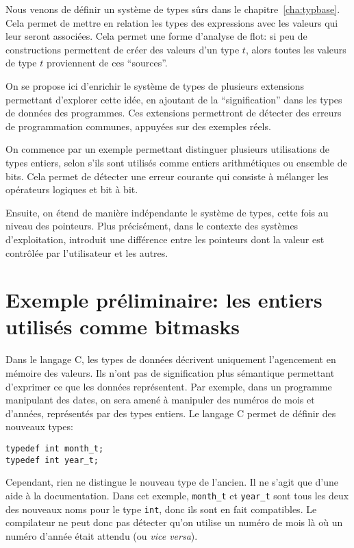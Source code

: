 

Nous venons de définir un système de types sûrs dans le
chapitre~\ref{cha:typbase}. Cela permet de mettre en relation les types des
expressions avec les valeurs qui leur seront associées. Cela permet une forme
d'analyse de flot: si peu de constructions permettent de créer des valeurs d'un
type $t$, alors toutes les valeurs de type $t$ proviennent de ces
\enquote{sources}.

On se propose ici d'enrichir le système de types de plusieurs extensions
permettant d'explorer cette idée, en ajoutant de la \enquote{signification} dans
les types de données des programmes. Ces extensions permettront de détecter des
erreurs de programmation communes, appuyées sur des exemples réels.

On commence par un exemple permettant distinguer plusieurs utilisations de types
entiers, selon s'ils sont utilisés comme entiers arithmétiques ou ensemble de
bits. Cela permet de détecter une erreur courante qui consiste à mélanger les
opérateurs logiques et bit à bit.

Ensuite, on étend de manière indépendante le système de types, cette fois au
niveau des pointeurs. Plus précisément, dans le contexte des systèmes
d'exploitation, introduit une différence entre les pointeurs dont la valeur est
contrôlée par l'utilisateur et les autres.

\section{Exemple préliminaire: les entiers utilisés comme bitmasks}

Dans le langage C, les types de données décrivent uniquement l'agencement en
mémoire des valeurs. Ils n'ont pas de signification plus sémantique permettant
d'exprimer ce que les données représentent. Par exemple, dans un programme
manipulant des dates, on sera amené à manipuler des numéros de mois et d'années,
représentés par des types entiers. Le langage C permet de définir des nouveaux
types:

\begin{verbatim}
typedef int month_t;
typedef int year_t;
\end{verbatim}

Cependant, rien ne distingue le nouveau type de l'ancien. Il ne s'agit que d'une
aide à la documentation. Dans cet exemple, \texttt{month\_t} et \texttt{year\_t}
sont tous les deux des nouveaux noms pour le type \texttt{int}, donc ils sont en
fait compatibles. Le compilateur ne peut donc pas détecter qu'on utilise un
numéro de mois là où un numéro d'année était attendu (ou \emph{vice versa}).

